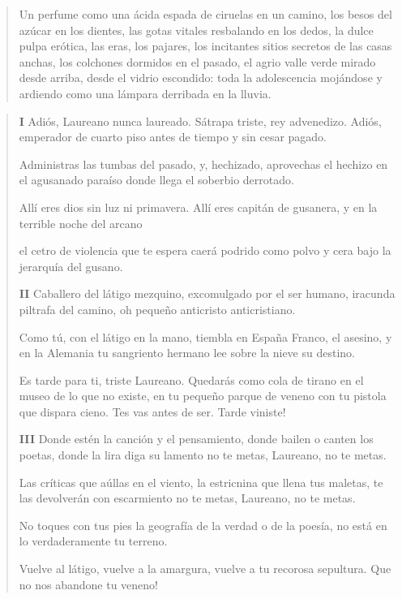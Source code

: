 \documentclass[12pt]{article}
\begin{document}
\clearpage
{}
\begin{verse}
Un perfume como una ácida espada  
de ciruelas en un camino,  
los besos del azúcar en los dientes,  
las gotas vitales resbalando en los dedos,  
la dulce pulpa erótica,  
las eras, los pajares, los incitantes  
sitios secretos de las casas anchas,  
los colchones dormidos en el pasado, el agrio valle verde  
mirado desde arriba, desde el vidrio escondido:  
toda la adolescencia mojándose y ardiendo  
como una lámpara derribada en la lluvia.  

\end{verse}

\clearpage
{}
\begin{verse}
\textbf{ I}
Adiós, Laureano nunca laureado.  
Sátrapa triste, rey advenedizo.  
Adiós, emperador de cuarto piso  
antes de tiempo y sin cesar pagado.  
	
Administras las tumbas del pasado,  
y, hechizado, aprovechas el hechizo  
en el agusanado paraíso  
donde llega el soberbio derrotado.  
	
Allí eres dios sin luz ni primavera.  
Allí eres capitán de gusanera,  
y en la terrible noche del arcano  
	
el cetro de violencia que te espera  
caerá podrido como polvo y cera  
bajo la jerarquía del gusano.  

\textbf{ II}
Caballero del látigo mezquino,  
excomulgado por el ser humano,  
iracunda piltrafa del camino,  
oh pequeño anticristo anticristiano.  
	
Como tú, con el látigo en la mano,  
tiembla en España Franco, el asesino,  
y en la Alemania tu sangriento hermano  
lee sobre la nieve su destino.  
	
Es tarde para ti, triste Laureano.  
Quedarás como cola de tirano  
en el museo de lo que no existe,  
en tu pequeño parque de veneno  
con tu pistola que dispara cieno.  
Tes vas antes de ser. Tarde viniste!  

\textbf{ III}
Donde estén la canción y el pensamiento,  
donde bailen o canten los poetas,  
donde la lira diga su lamento  
no te metas, Laureano, no te metas.  
	
Las críticas que aúllas en el viento,  
la estricnina que llena tus maletas,  
te las devolverán con escarmiento  
no te metas, Laureano, no te metas.  
	
No toques con tus pies la geografía  
de la verdad o de la poesía,  
no está en lo verdaderamente tu terreno.  
	
Vuelve al látigo, vuelve a la amargura,  
vuelve a tu recorosa sepultura.  
Que no nos abandone tu veneno!  
\end{verse}
\end{document}

